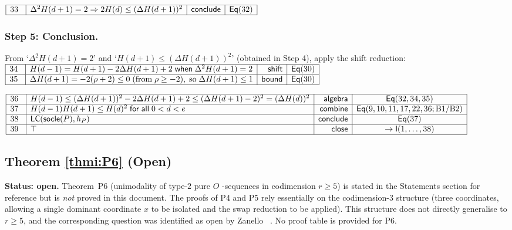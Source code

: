\documentclass[11pt,reqno]{amsart}
\begin{document}
\nointerlineskip\noindent$%
\begin{array}{|m{0.5cm}|l|r|c|}
\hline
33 & \Delta^{2}H(d+1)=2\Rightarrow2H(d)\le(\Delta H(d+1))^{2} & \mathsf{%
conclude} & \mathsf{Eq}(32) \\ \hline
\end{array}%
$

\subsubsection*{Step 5: Conclusion.}

\noindent From `$\Delta^{2}H(d+1)=2$' and `$H(d+1)\le(\Delta H(d+1))^{2}$'
(obtained in Step 4), apply the shift reduction: \noindent$%
\begin{array}{|m{0.5cm}|l|r|c|}
\hline
34 & H(d-1)=H(d+1)-2\Delta H(d+1)+2\;\mathsf{when}\;\Delta^{2}H(d+1)=2 & 
\mathsf{shift} & \mathsf{Eq}(30) \\ \hline
35 & \Delta H(d+1)=-2(\rho+2)\le0\;\text{(from}\;\rho\ge-2\text{)},\;\text{so%
}\;\Delta H(d+1)\le1 & \mathsf{bound} & \mathsf{Eq}(30) \\ \hline
\end{array}%
$

\nointerlineskip\noindent$%
\begin{array}{|m{0.5cm}|l|r|c|}
\hline
36 & H(d-1)\le(\Delta H(d+1))^{2}-2\Delta H(d+1)+2\le(\Delta
H(d+1)-2)^{2}=(\Delta H(d))^{2} & \mathsf{algebra} & \mathsf{Eq}(32,34,35)
\\ \hline
37 & H(d-1)H(d+1)\le H(d)^{2}\;\mathsf{for\;all}\;0<d<e & \mathsf{combine} & 
\mathsf{Eq}(9,10,11,17,22,36;\text{B1/B2}) \\ \hline
38 & \mathsf{LC}(\mathsf{socle}(P),h_{P}) & \mathsf{conclude} & \mathsf{Eq}%
(37) \\ \hline
39 & \top & \mathsf{close} & \to\mathsf{I}(1,\dots,38) \\ \hline
\end{array}%
$

\medskip


\subsection*{Theorem \protect\ref{thmi:P6} (Open)}

\noindent\textbf{Status: open.} Theorem~P6 (unimodality of type-$2$ pure $O$%
-sequences in codimension $r\ge5$) is stated in the Statements section for
reference but is \emph{not} proved in this document. The proofs of P4 and P5
rely essentially on the codimension-$3$ structure (three coordinates,
allowing a single dominant coordinate $x$ to be isolated and the swap
reduction to be applied). This structure does not directly generalise to $%
r\ge5$, and the corresponding question was identified as open by Zanello~%
\cite{zanello2024}. No proof table is provided for P6.
\end{document}
